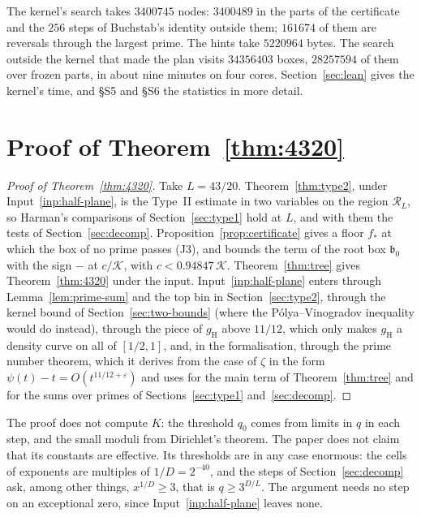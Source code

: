 \documentclass[11pt]{article}
\theoremstyle{definition}
\begin{document}
The kernel's search takes $3400745$ nodes: $3400489$ in the parts of the certificate and the $256$ steps of
Buchstab's identity outside them; $161674$ of them are reversals through the largest prime. The hints take $5220964$
bytes. The search outside the kernel that made the plan visits $34356403$ boxes, $28257594$ of them over frozen parts,
in about nine minutes on four cores. Section~\ref{sec:lean} gives the kernel's time, and \S S5 and \S S6 the
statistics in more detail.

\section{Proof of Theorem~\ref{thm:4320}}\label{sec:proof}

\begin{proof}[Proof of Theorem~\ref{thm:4320}]
Take $L = 43/20$. Theorem~\ref{thm:type2}, under Input~\ref{inp:half-plane}, is the Type~II estimate in two variables
on the region $\mathcal R_L$, so Harman's comparisons of Section~\ref{sec:type1} hold at $L$, and with them the tests of
Section~\ref{sec:decomp}. Proposition~\ref{prop:certificate} gives a floor $f_*$ at which the box of no prime passes
(J3), and bounds the term of the root box $\mathfrak b_0$ with the sign $-$ at $c/\mathcal K$, with $c < 0.94847\,
\mathcal K$. Theorem~\ref{thm:tree} gives Theorem~\ref{thm:4320} under the input.
Input~\ref{inp:half-plane} enters through Lemma~\ref{lem:prime-sum} and the top bin in Section~\ref{sec:type2},
through the kernel bound of Section~\ref{sec:two-bounds} (where the Pólya--Vinogradov inequality would do instead),
through the piece of $g_{\mathrm H}$ above $11/12$, which only makes $g_{\mathrm H}$ a density curve on all of
$[1/2, 1]$, and, in the formalisation, through the prime number theorem, which it derives from the case of $\zeta$
in the form $\psi(t) - t = O(t^{11/12 + \varepsilon})$ and uses for the main term of Theorem~\ref{thm:tree} and for the
sums over primes of Sections~\ref{sec:type1} and~\ref{sec:decomp}.
\end{proof}

The proof does not compute $K$: the threshold $q_0$ comes from limits in $q$ in each step, and the small moduli
from Dirichlet's theorem. The paper does not claim that its constants are effective. Its thresholds are in any case
enormous: the cells of exponents are multiples of $1/D = 2^{-40}$, and the steps of Section~\ref{sec:decomp} ask,
among other things, $x^{1/D} \ge 3$, that is $q \ge 3^{D/L}$. The argument needs no step on an exceptional zero,
since Input~\ref{inp:half-plane} leaves none.
\end{document}
